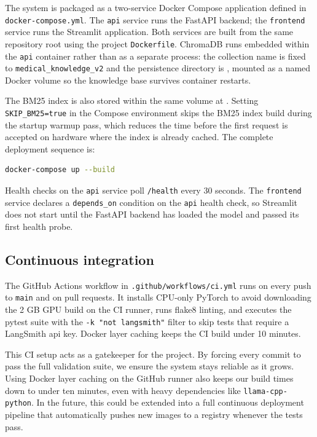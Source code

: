 The system is packaged as a two-service Docker Compose application defined in \texttt{docker-compose.yml}. The \texttt{api} service runs the FastAPI backend; the \texttt{frontend} service runs the Streamlit application. Both services are built from the same repository root using the project \texttt{Dockerfile}. ChromaDB runs embedded within the \texttt{api} container rather than as a separate process: the collection name is fixed to \texttt{medical\_knowledge\_v2} and the persistence directory is , mounted as a named Docker volume so the knowledge base survives container restarts.

The BM25 index is also stored within the same volume at . Setting \texttt{SKIP\_BM25=true} in the Compose environment skips the BM25 index build during the startup warmup pass, which reduces the time before the first request is accepted on hardware where the index is already cached. The complete deployment sequence is:

\begin{lstlisting}[language=bash, caption=Docker Compose deployment]
docker-compose up --build
\end{lstlisting}

Health checks on the \texttt{api} service poll \texttt{/health} every 30 seconds. The \texttt{frontend} service declares a \texttt{depends\_on} condition on the \texttt{api} health check, so Streamlit does not start until the FastAPI backend has loaded the model and passed its first health probe.

\subsection{Continuous integration}

The GitHub Actions workflow in \texttt{.github/workflows/ci.yml} runs on every push to \texttt{main} and on pull requests. It installs CPU-only PyTorch to avoid downloading the 2 GB GPU build on the CI runner, runs flake8 linting, and executes the pytest suite with the \texttt{-k "not langsmith"} filter to skip tests that require a LangSmith \ac{api} key. Docker layer caching keeps the CI build under 10 minutes.

This CI setup acts as a gatekeeper for the project. By forcing every commit to pass the full validation suite, we ensure the system stays reliable as it grows. Using Docker layer caching on the GitHub runner also keeps our build times down to under ten minutes, even with heavy dependencies like \texttt{llama-cpp-python}. In the future, this could be extended into a full continuous deployment pipeline that automatically pushes new images to a registry whenever the tests pass.

